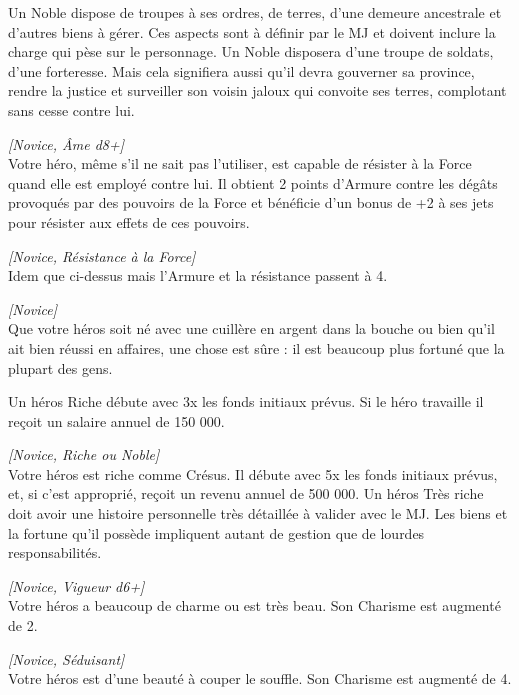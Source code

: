 \begin{description}[align=left]
        Un Noble dispose de troupes à ses ordres, de terres, d’une demeure ancestrale et d’autres biens à gérer. Ces aspects sont à définir par le MJ et doivent inclure la charge qui pèse sur le personnage. Un Noble disposera d’une troupe de soldats, d’une forteresse. Mais cela signifiera aussi qu’il devra gouverner sa province, rendre la justice et surveiller son voisin jaloux qui convoite ses terres, complotant sans cesse contre lui.

    \item [Résistance à la Force]
    	\emph{[Novice, \^Ame d8+]}\\
        Votre héro, même s’il ne sait pas l’utiliser, est capable de résister à la Force quand elle est employé contre lui. Il obtient 2 points d’Armure contre les dégâts provoqués par des pouvoirs de la Force et bénéficie d’un bonus de +2 à ses jets pour résister aux effets de ces pouvoirs.

    \item [Grande résistance à la Force]
    	\emph{[Novice, Résistance à la Force]}\\
        Idem que ci-dessus mais l’Armure et la résistance passent à 4.

    \item [Riche]
    	\emph{[Novice]}\\
        Que votre héros soit né avec une cuillère en argent dans la bouche ou bien qu’il ait bien réussi en affaires, une chose est sûre : il est beaucoup plus fortuné que la plupart des gens.

		Un héros Riche débute avec 3x les fonds initiaux prévus. Si le héro travaille il reçoit un salaire annuel de 150 000\crg.

    \item [Très riche]
    	\emph{[Novice, Riche ou Noble]}\\
        Votre héros est riche comme Crésus. Il débute avec 5x les fonds initiaux prévus, et, si c’est approprié, reçoit un revenu annuel de 500 000\crg. Un héros Très riche doit avoir une histoire personnelle très détaillée à valider avec le MJ. Les biens et la fortune qu’il possède impliquent autant de gestion que de lourdes responsabilités.

    \item [Séduisant]
    	\emph{[Novice, Vigueur d6+]}\\
        Votre héros a beaucoup de charme ou est très beau. Son Charisme est augmenté de 2.

    \item [Très séduisant]
    	\emph{[Novice, Séduisant]}\\
        Votre héros est d’une beauté à couper le souffle. Son Charisme est augmenté de 4.


\end{description}
